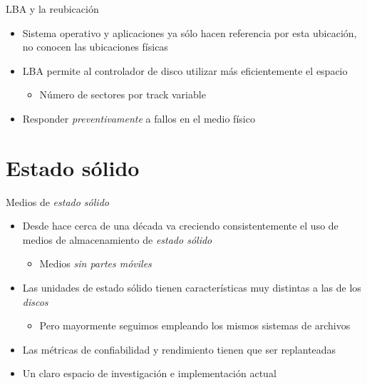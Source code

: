 \documentclass[presentation]{beamer}
\newcommand{\rarrow}{$\rightarrow$\hskip 0.5em}
\begin{document}
\begin{frame}[label={sec:orgdbb940b}]{LBA y la reubicación}
\begin{itemize}
\item Sistema operativo y aplicaciones ya sólo hacen referencia por esta
ubicación, no conocen las ubicaciones físicas
\item LBA permite al controlador de disco utilizar más eficientemente el
espacio
\begin{itemize}
\item Número de sectores por track variable
\end{itemize}
\item Responder \emph{preventivamente} a fallos en el medio físico
\end{itemize}
\end{frame}

\section{Estado sólido}
\label{sec:orga052045}

\begin{frame}[label={sec:org4ac8fcf}]{Medios de \emph{estado sólido}}
\begin{itemize}
\item Desde hace cerca de una década va creciendo consistentemente el uso
de medios de almacenamiento de \emph{estado sólido}
\begin{itemize}
\item Medios \emph{sin partes móviles}
\end{itemize}
\item Las unidades de estado sólido tienen características muy distintas
a las de los \emph{discos}
\begin{itemize}
\item Pero mayormente seguimos empleando los mismos sistemas de archivos
\end{itemize}
\item Las métricas de confiabilidad y rendimiento tienen que ser replanteadas
\item Un claro espacio de investigación e implementación actual
\end{itemize}
\end{frame}
\end{document}
